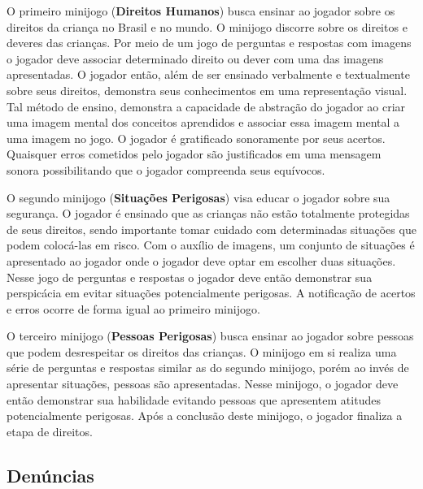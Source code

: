 \begin{figure}
  \vspace{-1.0cm}
\end{figure}

O primeiro minijogo (\textbf{Direitos Humanos}) busca ensinar ao jogador sobre os direitos da criança no Brasil e no mundo. O minijogo discorre sobre os direitos e deveres das crianças. Por meio de um jogo de perguntas e respostas com imagens o jogador deve associar determinado direito ou dever com uma das imagens apresentadas. O jogador então, além de ser ensinado verbalmente e textualmente sobre seus direitos, demonstra seus conhecimentos em uma representação visual. Tal método de ensino, demonstra a capacidade de abstração do jogador ao criar uma imagem mental dos conceitos aprendidos e associar essa imagem mental a uma imagem no jogo. O jogador é gratificado sonoramente por seus acertos. Quaisquer erros cometidos pelo jogador são justificados em uma mensagem sonora possibilitando que o jogador compreenda seus equívocos. 

O segundo minijogo (\textbf{Situações Perigosas}) visa educar o jogador sobre sua segurança. O jogador é ensinado que as crianças não estão totalmente protegidas de seus direitos, sendo importante tomar cuidado com determinadas situações que podem colocá-las em risco. %
Com o auxílio de imagens, um conjunto de situações é apresentado ao jogador onde o jogador deve optar em escolher duas situações. Nesse jogo de perguntas e respostas o jogador deve então demonstrar sua perspicácia em evitar situações potencialmente perigosas. A notificação de acertos e erros ocorre de forma igual ao primeiro minijogo.

O terceiro minijogo (\textbf{Pessoas Perigosas}) busca ensinar ao jogador sobre pessoas que podem desrespeitar os direitos das crianças. O minijogo em si realiza uma série de perguntas e respostas similar as do segundo minijogo, porém ao invés de apresentar situações, pessoas são apresentadas. Nesse minijogo, o jogador deve então demonstrar sua habilidade evitando pessoas que apresentem atitudes potencialmente perigosas. Após a conclusão deste minijogo, o jogador finaliza a etapa de direitos. 


\subsection{Denúncias}\label{subsec:3}

